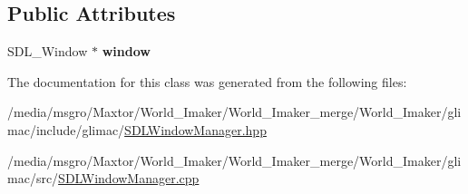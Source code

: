\subsection*{Public Attributes}
\begin{DoxyCompactItemize}
\item 
\mbox{\label{classglimac_1_1SDLWindowManager_a5999492fdc73a660c624015485a8a71e}} 
S\+D\+L\+\_\+\+Window $\ast$ {\bfseries window}
\end{DoxyCompactItemize}


The documentation for this class was generated from the following files\+:\begin{DoxyCompactItemize}
\item 
/media/msgro/\+Maxtor/\+World\+\_\+\+Imaker/\+World\+\_\+\+Imaker\+\_\+merge/\+World\+\_\+\+Imaker/glimac/include/glimac/\hyperlink{SDLWindowManager_8hpp}{S\+D\+L\+Window\+Manager.\+hpp}\item 
/media/msgro/\+Maxtor/\+World\+\_\+\+Imaker/\+World\+\_\+\+Imaker\+\_\+merge/\+World\+\_\+\+Imaker/glimac/src/\hyperlink{SDLWindowManager_8cpp}{S\+D\+L\+Window\+Manager.\+cpp}\end{DoxyCompactItemize}
